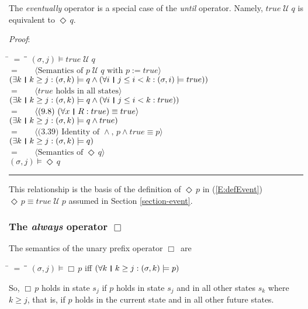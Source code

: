 \documentclass[12pt, fleqn, leqno]{article}
\newcommand{\lgap}{2pt}                             %
\newcommand{\mymathindent}{24pt}                    %
\newcommand{\Until}{\;\mathcal{U}\;}
\newcommand{\Event}{\Diamond\,}
\newcommand{\Always}{\Box\,}
\newcommand{\myqed}{\rule[-.23ex]{1.2ex}{2.0ex}}
\newcommand{\myqedtab}{\hspace{384pt}}              %
\newcommand{\thedr}{\rule[-.25ex]{.32mm}{1.75ex}}   %
\newcommand{\dr}{\;\,\thedr\,\;}                    %
\newcommand{\rb}{:}                                 %
\newcommand{\all}{\forall}                          %
\newcommand{\ext}{\exists}                          %
\newcommand{\Gll} {\langle}                         %
\newcommand{\Ggg} {\rangle}                         %
\newcommand{\Hint}[1]     {\ \ \ $\Gll              \mbox{#1} \Ggg$ }   %
\begin{document}
The \textit{eventually} operator is a special case of the \textit{until} operator.
Namely, $true \Until q$ is equivalent to $\Event q$.

\emph{Proof}:
\begin{tabbing}
\hspace{\mymathindent} \= $= \;$ \= \myqedtab \= \kill
	\> \>   $(\sigma, j) \models true\Until q$\\[\lgap]
	\> $=$  \>  \Hint{Semantics of $p\Until q$ with $p:=true$}\\[\lgap]
	\> \>   $(\ext k \dr k \ge j \rb (\sigma,k) \models q \land (\all i \dr j\le i < k \rb (\sigma,i) \models true))$\\[\lgap]
	\> $=$  \>  \Hint{$true$ holds in all states}\\[\lgap]
	\> \>   $(\ext k \dr k \ge j \rb (\sigma,k) \models q \land (\all i \dr j\le i < k \rb true))$\\[\lgap]
	\> $=$  \>  \Hint{(9.8) $(\all x\dr R\rb true)\equiv true$}\\[\lgap]
	\> \>   $(\ext k \dr k \ge j \rb (\sigma,k) \models q \land true)$\\[\lgap]
	\> $=$  \>  \Hint{(3.39) Identity of $\land$, $p \land true \equiv p$}\\[\lgap]
	\> \>   $(\ext k \dr k \ge j \rb (\sigma,k) \models q)$\\[\lgap]
	\> $=$  \>  \Hint{Semantics of $\Event q$}\\[\lgap]
	\> \>   $(\sigma, j) \models \Event q$ \quad \myqed
\end{tabbing}
This relationship is the basis of the definition of $\Event p$ in (\ref{E:defEvent}) $\Event p \equiv true \Until p$
assumed in Section \ref{section-event}.

\subsubsection*{The \textit{always} operator $\Always$}

The semantics of the unary prefix operator $\Always$ are
\begin{tabbing}
\hspace{\mymathindent} \= $= \;$ \= \myqedtab \= \kill
  \> $(\sigma, j) \models \Always p$ \quad iff \quad $(\all k \dr k \ge j \rb (\sigma,k) \models p)$
\end{tabbing}
So, $\Always p$ holds in state $s_j$ if $p$ holds in state $s_j$ and in all other states $s_k$ where $k\ge j$,
that is, if $p$ holds in the current state and in all other future states.
\end{document}
